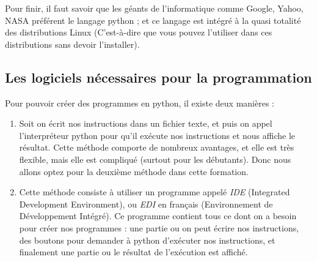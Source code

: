 \documentclass[12pt]{article}
\begin{document}
            Pour finir, il faut savoir que les géants de l'informatique comme Google, Yahoo, NASA préférent le langage
            python ; et ce langage est intégré à la quasi totalité des distributions Linux (C'est-à-dire que vous pouvez l'utiliser
            dans ces distributions sans devoir l'installer).


    \subsection{Les logiciels nécessaires pour la programmation}
        Pour pouvoir créer des programmes en python, il existe deux manières :
        \begin{enumerate}
            \item Soit on écrit nos instructions dans un fichier texte, et puis on appel l'interpréteur python pour
                qu'il exécute nos instructions et nous affiche le résultat. Cette méthode comporte de nombreux
                avantages, et elle est très flexible, mais elle est compliqué (surtout pour les débutants). Donc nous
                allons optez pour la deuxième méthode dans cette formation.
            \item Cette méthode consiste à utiliser un programme appelé \emph{IDE} (Integrated Development Environment),
                ou \emph{EDI} en français (Environnement de Développement Intégré). Ce programme contient tous ce dont
                on a besoin pour créer nos programmes : une partie ou on peut écrire nos instructions, des boutons
                pour demander à python d'exécuter nos instructions, et finalement une partie ou le résultat de
                l'exécution est affiché.
        \end{enumerate}
\end{document}
